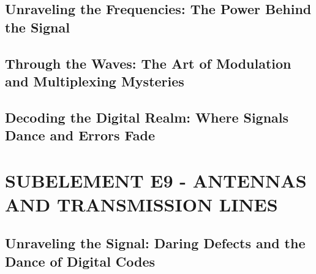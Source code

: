 \documentclass[12pt]{book}
\begin{document}
\section{Unraveling the Frequencies: The Power Behind the Signal}











\section{Through the Waves: The Art of Modulation and Multiplexing Mysteries}











\section{Decoding the Digital Realm: Where Signals Dance and Errors Fade}















\chapter{SUBELEMENT E9 - ANTENNAS AND TRANSMISSION LINES}
\section{Unraveling the Signal: Daring Defects and the Dance of Digital Codes}











\end{document}
